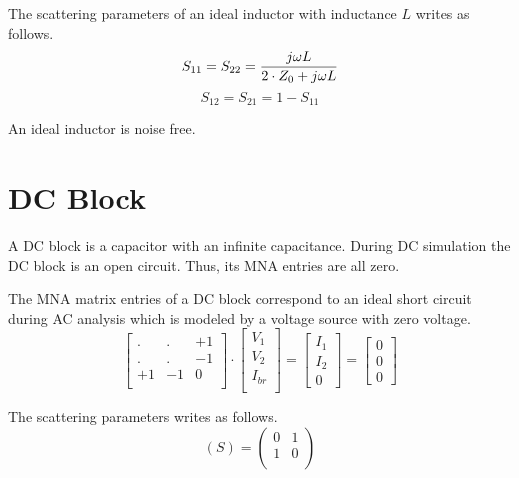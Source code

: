The scattering parameters of an ideal inductor with inductance $L$
writes as follows.
\begin{equation}
S_{11} = S_{22} = \frac{j\omega L}{2\cdot Z_0 + j\omega L} \\
\end{equation}
\begin{equation}
S_{12} = S_{21} = 1-S_{11}
\end{equation}

An ideal inductor is noise free.


\section{DC Block}

A DC block is a capacitor with an infinite capacitance. During DC
simulation the DC block is an open circuit. Thus, its MNA
entries are all zero.

\addvspace{12pt}

The MNA matrix entries of a DC block correspond to an ideal short
circuit during AC analysis which is modeled by a voltage source with
zero voltage.
\begin{equation}
\begin{bmatrix}
. & . & +1\\
. & . & -1\\
+1 & -1 & 0\\
\end{bmatrix}
\cdot
\begin{bmatrix}
V_1\\
V_2\\
I_{br}\\
\end{bmatrix}
=
\begin{bmatrix}
I_1\\
I_2\\
0
\end{bmatrix}
=
\begin{bmatrix}
0\\
0\\
0
\end{bmatrix}
\end{equation}

The scattering parameters writes as follows.
\begin{equation}
(S) =
\begin{pmatrix}
0 & 1\\
1 & 0\\
\end{pmatrix}
\end{equation}

